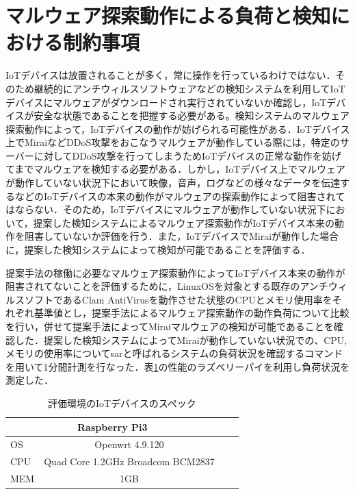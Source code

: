 \section{マルウェア探索動作による負荷と検知における制約事項}
IoTデバイスは放置されることが多く，常に操作を行っているわけではない．そのため継続的にアンチウィルスソフトウェアなどの検知システムを利用してIoTデバイスにマルウェアがダウンロードされ実行されていないか確認し，IoTデバイスが安全な状態であることを把握する必要がある。検知システムのマルウェア探索動作によって，IoTデバイスの動作が妨げられる可能性がある．IoTデバイス上でMiraiなどDDoS攻撃をおこなうマルウェアが動作している際には，特定のサーバーに対してDDoS攻撃を行ってしまうためIoTデバイスの正常な動作を妨げてまでマルウェアを検知する必要がある．しかし，IoTデバイス上でマルウェアが動作していない状況下において映像，音声，ログなどの様々なデータを伝達するなどのIoTデバイスの本来の動作がマルウェアの探索動作によって阻害されてはならない．そのため，IoTデバイスにマルウェアが動作していない状況下において，提案した検知システムによるマルウェア探索動作がIoTデバイス本来の動作を阻害していないか評価を行う．また，IoTデバイスでMiraiが動作した場合に，提案した検知システムによって検知が可能であることを評価する．\par
提案手法の稼働に必要なマルウェア探索動作によってIoTデバイス本来の動作が阻害されてないことを評価するために，LinuxOSを対象とする既存のアンチウィルスソフトであるClam AntiVirusを動作させた状態のCPUとメモリ使用率をそれぞれ基準値とし，提案手法によるマルウェア探索動作の動作負荷について比較を行い，併せて提案手法によってMiraiマルウェアの検知が可能であることを確認した．提案した検知システムによってMiraiが動作していない状況での、CPU,メモリの使用率についてsarと呼ばれるシステムの負荷状況を確認するコマンドを用いて1分間計測を行なった．表\ref{tab:spec}の性能のラズベリーパイを利用し負荷状況を測定した．
\begin{table}[h]
   \caption{評価環境のIoTデバイスのスペック}
   \label{tab:spec}
   \centering
   \begin{tabular}{|l|c|l|l|l|}
   \hline
   \multicolumn{3}{|c|}{Raspberry Pi3} \\ \hline
   OS     & \multicolumn{2}{c|}{Openwrt 4.9.120}                   \\ \hline
   CPU    & \multicolumn{2}{c|}{Quad Core 1.2GHz Broadcom BCM2837} \\ \hline
   MEM    & \multicolumn{2}{c|}{1GB}                               \\ \hline
   \end{tabular}
\end{table}

